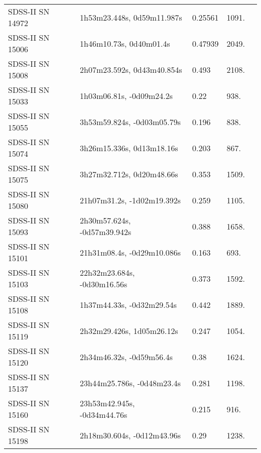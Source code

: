 \begin{longtable}{lllll}
 SDSS-II SN 14972 &     1h53m23.448s, 0d59m11.987s &  0.25561 &          1091. &    \citet{2016SDSSD.C...0000:} \\
 SDSS-II SN 15006 &        1h46m10.73s, 0d40m01.4s &  0.47939 &          2049. &    \citet{2016SDSSD.C...0000:} \\
 SDSS-II SN 15008 &     2h07m23.592s, 0d43m40.854s &    0.493 &          2108. &    \citet{2011ApJ...738..162S} \\
 SDSS-II SN 15033 &       1h03m06.81s, -0d09m24.2s &     0.22 &           938. &    \citet{2010ApJ...713.1026D} \\
 SDSS-II SN 15055 &     3h53m59.824s, -0d03m05.79s &    0.196 &           838. &    \citet{2010ApJ...713.1026D} \\
 SDSS-II SN 15074 &      3h26m15.336s, 0d13m18.16s &    0.203 &           867. &    \citet{2011ApJ...738..162S} \\
 SDSS-II SN 15075 &      3h27m32.712s, 0d20m48.66s &    0.353 &          1509. &    \citet{2011ApJ...738..162S} \\
 SDSS-II SN 15080 &     21h07m31.2s, -1d02m19.392s &    0.259 &          1105. &    \citet{2011ApJ...738..162S} \\
 SDSS-II SN 15093 &    2h30m57.624s, -0d57m39.942s &    0.388 &          1658. &    \citet{2011ApJ...738..162S} \\
 SDSS-II SN 15101 &     21h31m08.4s, -0d29m10.086s &    0.163 &           693. &    \citet{2011ApJ...738..162S} \\
 SDSS-II SN 15103 &    22h32m23.684s, -0d30m16.56s &    0.373 &          1592. &    \citet{2011ApJ...738..162S} \\
 SDSS-II SN 15108 &      1h37m44.33s, -0d32m29.54s &    0.442 &          1889. &    \citet{2011ApJ...738..162S} \\
 SDSS-II SN 15119 &      2h32m29.426s, 1d05m26.12s &    0.247 &          1054. &    \citet{2011ApJ...738..162S} \\
 SDSS-II SN 15120 &       2h34m46.32s, -0d59m56.4s &     0.38 &          1624. &    \citet{2011ApJ...738..162S} \\
 SDSS-II SN 15137 &     23h44m25.786s, -0d48m23.4s &    0.281 &          1198. &    \citet{2010ApJ...713.1026D} \\
 SDSS-II SN 15160 &    23h53m42.945s, -0d34m44.76s &    0.215 &           916. &    \citet{2011ApJ...738..162S} \\
 SDSS-II SN 15198 &     2h18m30.604s, -0d12m43.96s &     0.29 &          1238. &    \citet{2010ApJ...713.1026D} \\

\end{longtable}
